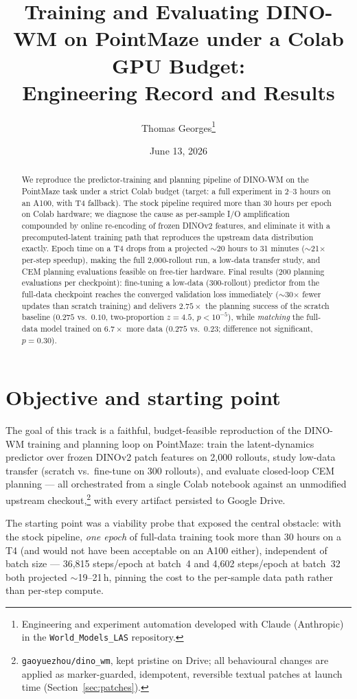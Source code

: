 \documentclass[11pt]{article}
\title{Training and Evaluating DINO-WM on PointMaze under a Colab GPU Budget:\\
       Engineering Record and Results}
\author{Thomas Georges\thanks{Engineering and experiment automation developed
        with Claude (Anthropic) in the \texttt{World\_Models\_LAS} repository.}}
\date{June 13, 2026}
\begin{document}
\maketitle

\begin{abstract}
We reproduce the predictor-training and planning pipeline of DINO-WM
\cite{dinowm} on the PointMaze task under a strict Colab budget (target:
a full experiment in 2--3 hours on an A100, with T4 fallback). The stock
pipeline required more than 30 hours per epoch on Colab hardware; we diagnose
the cause as per-sample I/O amplification compounded by online re-encoding of
frozen DINOv2 features, and eliminate it with a precomputed-latent training
path that reproduces the upstream data distribution exactly. Epoch time on a
T4 drops from a projected $\sim$20 hours to 31 minutes ($\sim$21$\times$
per-step speedup), making the full 2{,}000-rollout run, a low-data transfer
study, and CEM planning evaluations feasible on free-tier hardware. Final
results (200 planning evaluations per checkpoint): fine-tuning a low-data
(300-rollout) predictor from the full-data checkpoint reaches the converged
validation loss immediately ($\sim$30$\times$ fewer updates than scratch
training) and delivers $2.75\times$ the planning success of the scratch
baseline ($0.275$ vs.\ $0.10$, two-proportion $z{=}4.5$, $p<10^{-5}$), while
\emph{matching} the full-data model trained on $6.7\times$ more data ($0.275$
vs.\ $0.23$; difference not significant, $p{=}0.30$).
\end{abstract}

\section{Objective and starting point}

The goal of this track is a faithful, budget-feasible reproduction of the
DINO-WM training and planning loop on PointMaze: train the latent-dynamics
predictor over frozen DINOv2 patch features on 2{,}000 rollouts, study
low-data transfer (scratch vs.\ fine-tune on 300 rollouts), and evaluate
closed-loop CEM planning --- all orchestrated from a single Colab notebook
against an unmodified upstream checkout,\footnote{\texttt{gaoyuezhou/dino\_wm},
kept pristine on Drive; all behavioural changes are applied as marker-guarded,
idempotent, reversible textual patches at launch time
(Section~\ref{sec:patches}).} with every artifact persisted to Google Drive.

The starting point was a viability probe that exposed the central obstacle:
with the stock pipeline, \emph{one epoch} of full-data training took more
than 30 hours on a T4 (and would not have been acceptable on an A100 either),
independent of batch size --- 36{,}815 steps/epoch at batch~4 and 4{,}602
steps/epoch at batch~32 both projected $\sim$19--21\,h, pinning the cost to
the per-sample data path rather than per-step compute.
\end{document}
